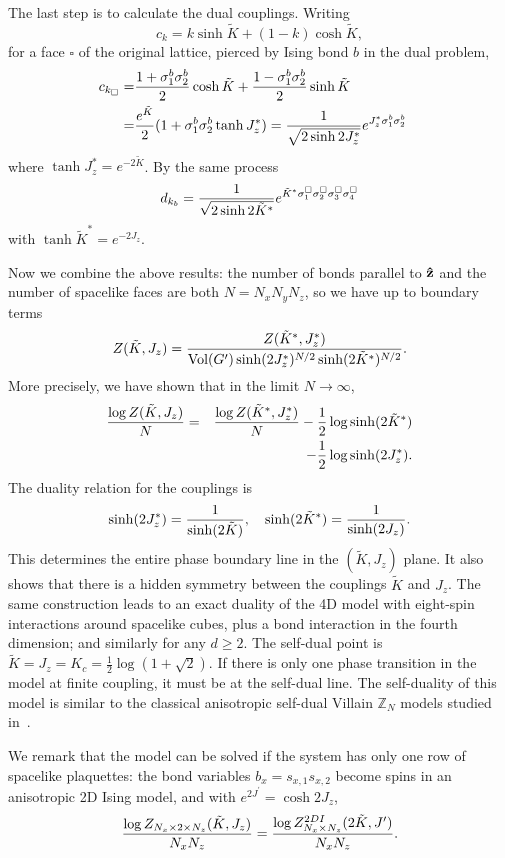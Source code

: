 \documentclass[prl,twocolumn,showpacs,superscriptaddress,preprintnumbers,amssymb]{revtex4}
\def\vol{{\rm Vol}}
\newcommand{\beq}{\begin{equation}}
\newcommand{\eeq}{\end{equation}}
\newcommand{\beqn}{\begin{eqnarray}}
\newcommand{\eeqn}{\end{eqnarray}}
\begin{document}
The last step is to calculate the dual couplings.
Writing \beq c_k = k \sinh {\tilde K} + (1-k) \cosh {\tilde K},
\eeq for a face $\square$ of the original lattice, pierced by
Ising bond $b$ in the dual problem, \beqn c_{k_\square} =& {1 +
\sigma^b_1 \sigma^b_2 \over 2} \cosh {\tilde K} + {1 - \sigma^b_1
\sigma^b_2 \over 2} \sinh {\tilde K} \cr =& {e^{{\tilde K}} \over
2} (1 + \sigma^b_1 \sigma^b_2 \tanh J_z^*) = {1 \over \sqrt{2
\sinh 2J_z^*}} e^{J_z^* \sigma^b_1 \sigma^b_2} \eeqn where $\tanh
J_z^* = e^{-2 {\tilde K}}$.  By the same process \beq d_{k_b} = {1
\over \sqrt{2 \sinh 2 {\tilde K}^{*}}} e^{{\tilde K}^{*}
\sigma^\square_1\sigma^\square_2 \sigma^\square_3
\sigma^\square_4} \eeq with $\tanh {\tilde K}^{*} = e^{-2 J_z}$.

Now we combine the above results: the number of bonds
parallel to ${\bf \hat z}$ and the number of spacelike faces are
both $N = N_x N_y N_z$, so we have up to boundary terms
\beq Z({\tilde K},J_z) =
{Z({\tilde K}^*,J_z^*) \over \vol(G^\prime) \sinh(2 J_z^*)^{N/2} \sinh(2
{\tilde K}^*)^{N/2}}. \eeq More precisely, we have shown that in the limit
$N \rightarrow \infty$, \beqn {\log Z(\tilde K,J_z) \over N} &=&
{\log Z({\tilde K}^*,J_z^*) \over N} - \frac{1}{2} \log \sinh(2 {\tilde K}^*) \cr&&
- \frac{1}{2} \log \sinh(2 J_z^*). \eeqn The duality relation for
the couplings is \beq \sinh (2 J_z^*) = {1 \over \sinh(2 {\tilde
K})},\quad \sinh(2 {\tilde K}^*) = {1 \over \sinh(2 J_z)}. \eeq This
determines the entire phase boundary line in the $({\tilde K},
J_z)$ plane.  It also shows that there is a hidden symmetry
between the couplings ${\tilde K}$ and $J_z$.  The
same construction leads to an exact duality of the 4D model with
eight-spin interactions around spacelike cubes, plus a bond
interaction in the fourth dimension; and similarly for any $d \geq
2$.  The self-dual point is ${\tilde K} = J_z = K_c = \frac{1}{2}
\log(1 + \sqrt{2}).$ If there is only one phase transition in the
model at finite coupling, it must be at
the self-dual line.  The self-duality of this model is similar to
the classical anisotropic self-dual Villain $\mathbb{Z}_N$ models
studied in~\cite{savit2}.

We remark that the model can be solved if the system has only one row of
spacelike plaquettes: the bond variables $b_x = s_{x,1} s_{x,2}$
become spins in an anisotropic 2D Ising model, and 
with $e^{2 J^\prime} = \cosh 2 J_z$,
\beq {\log
Z_{N_x \times 2 \times N_z}({\tilde K},J_z) \over N_x N_z} = {\log
Z^{2DI}_{N_x \times N_z} (2 {\tilde K},J^\prime) \over N_x N_z}.
\eeq
\end{document}
